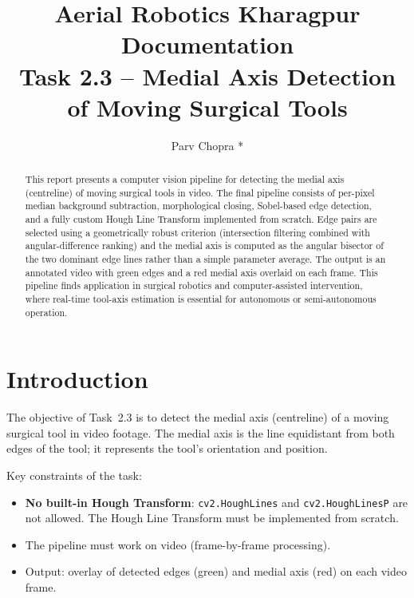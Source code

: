 \documentclass[conference, twocolumn]{IEEEtran}
\title{Aerial Robotics Kharagpur Documentation\\Task 2.3 -- Medial Axis Detection of Moving Surgical Tools}
\author{Parv Chopra *}
\begin{document}
\maketitle

\begin{abstract}
This report presents a computer vision pipeline for detecting the medial axis (centreline) of moving surgical tools in video. The final pipeline consists of per-pixel median background subtraction, morphological closing, Sobel-based edge detection, and a fully custom Hough Line Transform implemented from scratch. Edge pairs are selected using a geometrically robust criterion (intersection filtering combined with angular-difference ranking) and the medial axis is computed as the angular bisector of the two dominant edge lines rather than a simple parameter average. The output is an annotated video with green edges and a red medial axis overlaid on each frame. This pipeline finds application in surgical robotics and computer-assisted intervention, where real-time tool-axis estimation is essential for autonomous or semi-autonomous operation.
\end{abstract}

\section{Introduction}

The objective of Task~2.3 is to detect the medial axis (centreline) of a moving surgical tool in video footage. The medial axis is the line equidistant from both edges of the tool; it represents the tool's orientation and position.

Key constraints of the task:
\begin{itemize}
    \item \textbf{No built-in Hough Transform}: \texttt{cv2.HoughLines} and \texttt{cv2.HoughLinesP} are not allowed. The Hough Line Transform must be implemented from scratch.
    \item The pipeline must work on video (frame-by-frame processing).
    \item Output: overlay of detected edges (green) and medial axis (red) on each video frame.
\end{itemize}
\end{document}
